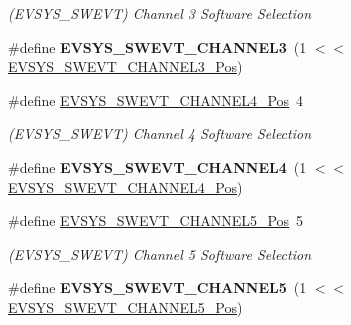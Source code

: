 \begin{DoxyCompactItemize}
\begin{DoxyCompactList}\small\item\em (E\+V\+S\+Y\+S\+\_\+\+S\+W\+E\+V\+T) Channel 3 Software Selection \end{DoxyCompactList}\item 
\hypertarget{group___s_a_m_l21___e_v_s_y_s_ga48819779f519ebaa3f2af3bc555d798a}{}\#define {\bfseries E\+V\+S\+Y\+S\+\_\+\+S\+W\+E\+V\+T\+\_\+\+C\+H\+A\+N\+N\+E\+L3}~(1 $<$$<$ \hyperlink{group___s_a_m_l21___e_v_s_y_s_ga8e3359be2580cdae8c60963148ec2a81}{E\+V\+S\+Y\+S\+\_\+\+S\+W\+E\+V\+T\+\_\+\+C\+H\+A\+N\+N\+E\+L3\+\_\+\+Pos})\label{group___s_a_m_l21___e_v_s_y_s_ga48819779f519ebaa3f2af3bc555d798a}

\item 
\hypertarget{group___s_a_m_l21___e_v_s_y_s_gae5c6f56b2cf90a57d0e30566c81cb95e}{}\#define \hyperlink{group___s_a_m_l21___e_v_s_y_s_gae5c6f56b2cf90a57d0e30566c81cb95e}{E\+V\+S\+Y\+S\+\_\+\+S\+W\+E\+V\+T\+\_\+\+C\+H\+A\+N\+N\+E\+L4\+\_\+\+Pos}~4\label{group___s_a_m_l21___e_v_s_y_s_gae5c6f56b2cf90a57d0e30566c81cb95e}

\begin{DoxyCompactList}\small\item\em (E\+V\+S\+Y\+S\+\_\+\+S\+W\+E\+V\+T) Channel 4 Software Selection \end{DoxyCompactList}\item 
\hypertarget{group___s_a_m_l21___e_v_s_y_s_ga539da52dba09027e8295066a0f64df8b}{}\#define {\bfseries E\+V\+S\+Y\+S\+\_\+\+S\+W\+E\+V\+T\+\_\+\+C\+H\+A\+N\+N\+E\+L4}~(1 $<$$<$ \hyperlink{group___s_a_m_l21___e_v_s_y_s_gae5c6f56b2cf90a57d0e30566c81cb95e}{E\+V\+S\+Y\+S\+\_\+\+S\+W\+E\+V\+T\+\_\+\+C\+H\+A\+N\+N\+E\+L4\+\_\+\+Pos})\label{group___s_a_m_l21___e_v_s_y_s_ga539da52dba09027e8295066a0f64df8b}

\item 
\hypertarget{group___s_a_m_l21___e_v_s_y_s_gaf4c9fa0dccae3d5e0ebb2e5e2dd83b64}{}\#define \hyperlink{group___s_a_m_l21___e_v_s_y_s_gaf4c9fa0dccae3d5e0ebb2e5e2dd83b64}{E\+V\+S\+Y\+S\+\_\+\+S\+W\+E\+V\+T\+\_\+\+C\+H\+A\+N\+N\+E\+L5\+\_\+\+Pos}~5\label{group___s_a_m_l21___e_v_s_y_s_gaf4c9fa0dccae3d5e0ebb2e5e2dd83b64}

\begin{DoxyCompactList}\small\item\em (E\+V\+S\+Y\+S\+\_\+\+S\+W\+E\+V\+T) Channel 5 Software Selection \end{DoxyCompactList}\item 
\hypertarget{group___s_a_m_l21___e_v_s_y_s_ga295217af9f416319dc54beaed2aa94c2}{}\#define {\bfseries E\+V\+S\+Y\+S\+\_\+\+S\+W\+E\+V\+T\+\_\+\+C\+H\+A\+N\+N\+E\+L5}~(1 $<$$<$ \hyperlink{group___s_a_m_l21___e_v_s_y_s_gaf4c9fa0dccae3d5e0ebb2e5e2dd83b64}{E\+V\+S\+Y\+S\+\_\+\+S\+W\+E\+V\+T\+\_\+\+C\+H\+A\+N\+N\+E\+L5\+\_\+\+Pos})\label{group___s_a_m_l21___e_v_s_y_s_ga295217af9f416319dc54beaed2aa94c2}


\end{DoxyCompactItemize}
